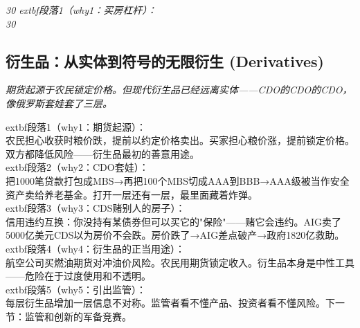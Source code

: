 \documentclass[openany, a4paper, 12pt]{book}
\newenvironment{motivation}{
	\vspace{0.5em}
	\begin{tcolorbox}[
		colback=gray!10,           %
		colframe=gray!60,          %
		title=\textit{本章动机 (Motivation)},
		fonttitle=\bfseries,
		arc=0mm,                   %
		leftrule=3mm               %
		]
		\small \itshape %
	}{
	\end{tcolorbox}
	\vspace{1em}
}
\begin{document}
	\begin{motivation}30%
		extbf{段落1（why1：买房杠杆）}：\\30%

	\subsection{衍生品：从实体到符号的无限衍生 (Derivatives)}
	\begin{motivation}期货起源于农民锁定价格。但现代衍生品已经远离实体——CDO的CDO的CDO，像俄罗斯套娃套了三层。\end{motivation}
		extbf{段落1（why1：期货起源）}：\\农民担心收获时粮价跌，提前以约定价格卖出。买家担心粮价涨，提前锁定价格。双方都降低风险——衍生品最初的善意用途。\\	extbf{段落2（why2：CDO套娃）}：\\把1000笔贷款打包成MBS→再把100个MBS切成AAA到BBB→AAA级被当作安全资产卖给养老基金。打开一层还有一层，最里面藏着炸弹。\\	extbf{段落3（why3：CDS赌别人的房子）}：\\信用违约互换：你没持有某债券但可以买它的"保险"——赌它会违约。AIG卖了5000亿美元CDS以为房价不会跌。房价跌了→AIG差点破产→政府1820亿救助。\\	extbf{段落4（why4：衍生品的正当用途）}：\\航空公司买燃油期货对冲油价风险。农民用期货锁定收入。衍生品本身是中性工具——危险在于过度使用和不透明。\\	extbf{段落5（why5：引出监管）}：\\每层衍生品增加一层信息不对称。监管者看不懂产品、投资者看不懂风险。下一节：监管和创新的军备竞赛。


\end{motivation}
\end{document}
